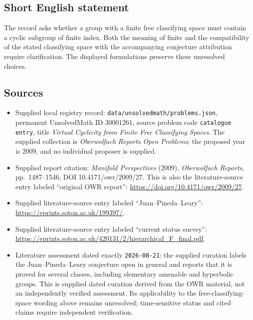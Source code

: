 \documentclass[11pt]{article}
\begin{document}
\subsection{Short English statement}
The record asks whether a group with a finite free classifying space must contain a cyclic subgroup of finite index. Both the meaning of finite and the compatibility of the stated classifying space with the accompanying conjecture attribution require clarification. The displayed formulations preserve these unresolved choices.
\subsection{Sources}
\begin{itemize}
\item Supplied local registry record: \texttt{data/unsolvedmath/problems.json}, permanent UnsolvedMath ID \(30001261\), source problem code \texttt{catalogue entry}, title \emph{Virtual Cyclicity from Finite Free Classifying Spaces}. The supplied collection is \emph{Oberwolfach Reports Open Problems}; the proposed year is 2009, and no individual proposer is supplied.
\item Supplied report citation: \emph{Manifold Perspectives} (2009), \emph{Oberwolfach Reports}, pp.\ 1487--1546, DOI 10.4171/owr/2009/27. This is also the literature-source entry labeled ``original OWR report'': \url{https://doi.org/10.4171/owr/2009/27}.
\item Supplied literature-source entry labeled ``Juan--Pineda--Leary'': \url{https://eprints.soton.ac.uk/199397/}.
\item Supplied literature-source entry labeled ``current status survey'': \url{https://eprints.soton.ac.uk/420131/2/hierarchical_F_final.pdf}.
\item Literature assessment dated exactly \texttt{2026-08-21}: the supplied curation labels the Juan--Pineda--Leary conjecture open in general and reports that it is proved for several classes, including elementary amenable and hyperbolic groups. This is supplied dated curation derived from the OWR material, not an independently verified assessment. Its applicability to the free-classifying-space wording above remains unresolved; time-sensitive status and cited claims require independent verification.
\end{itemize}
\end{document}
